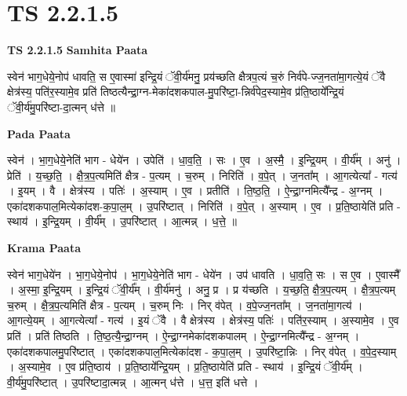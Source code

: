 \documentclass[17pt]{extarticle}
\begin{document}
\section*{ TS 2.2.1.5 }

\textbf{TS 2.2.1.5 } \newline
\textbf{Samhita Paata} \newline

स्वेन॑ भाग॒धेये॒नोप॑ धावति॒ स ए॒वास्मा॑ इन्द्रि॒यं ॅवी॒र्य॑मनु॒ प्रय॑च्छति क्षैत्रप॒त्यं च॒रुं निर्व॑पे-ज्ज॒नता॑मा॒गत्ये॒यं ॅवै क्षेत्र॑स्य॒ पति॑र॒स्यामे॒व प्रति॑ तिष्ठत्यैन्द्रा॒ग्न-मेका॑दशकपाल-मु॒परि॑ष्टा॒-न्निर्व॑पेद॒स्यामे॒व प्र॑ति॒ष्ठाये᳚न्द्रि॒यं ॅवी॒र्य॑मु॒परि॑ष्टा-दा॒त्मन् ध॑त्ते ॥ \newline

\textbf{Pada Paata} \newline

स्वेन॑ । भा॒ग॒धेये॒नेति॑ भाग - धेये॑न । उपेति॑ । धा॒व॒ति॒ । सः । ए॒व । अ॒स्मै॒ । इ॒न्द्रि॒यम् । वी॒र्य᳚म् । अनु॑ । प्रेति॑ । य॒च्छ॒ति॒ । क्षै॒त्र॒प॒त्यमिति॑ क्षैत्र - प॒त्यम् । च॒रुम् । निरिति॑ । व॒पे॒त् । ज॒नता᳚म् । आ॒गत्येत्या᳚ - गत्य॑ । इ॒यम् । वै । क्षेत्र॑स्य । पतिः॑ । अ॒स्याम् । ए॒व । प्रतीति॑ । ति॒ष्ठ॒ति॒ । ऐ॒न्द्रा॒ग्नमित्यै᳚न्द्र - अ॒ग्नम् । एका॑दशकपाल॒मित्येका॑दश-क॒पा॒ल॒म् । उ॒परि॑ष्टात् । निरिति॑ । व॒पे॒त् । अ॒स्याम् । ए॒व । प्र॒ति॒ष्ठायेति॑ प्रति - स्थाय॑ । इ॒न्द्रि॒यम् । वी॒र्य᳚म् । उ॒परि॑ष्टात् । आ॒त्मन्न् । ध॒त्ते॒ ॥  \newline


\textbf{Krama Paata} \newline

स्वेन॑ भाग॒धेये॑न । भा॒ग॒धेये॒नोप॑ । भा॒ग॒धेये॒नेति॑ भाग - धेये॑न । उप॑ धावति । धा॒व॒ति॒ सः । स ए॒व । ए॒वास्मै᳚ । अ॒स्मा॒ इ॒न्द्रि॒यम् । इ॒न्द्रि॒यं ॅवी॒र्य᳚म् । वी॒र्य॑मनु॑ । अनु॒ प्र । प्र य॑च्छति । य॒च्छ॒ति॒ क्षै॒त्र॒प॒त्यम् । क्षै॒त्र॒प॒त्यम् च॒रुम् । क्षै॒त्र॒प॒त्यमिति॑ क्षैत्र - प॒त्यम् । च॒रुम् निः । निर् व॑पेत् । व॒पे॒ज्ज॒नता᳚म् । ज॒नता॑मा॒गत्य॑ । आ॒गत्ये॒यम् । आ॒गत्येत्या᳚ - गत्य॑ । इ॒यं ॅवै । वै क्षेत्र॑स्य । क्षेत्र॑स्य॒ पतिः॑ । पति॑र॒स्याम् । अ॒स्यामे॒व । ए॒व प्रति॑ । प्रति॑ तिष्ठति । ति॒ष्ठ॒त्यै॒न्द्रा॒ग्नम् । ऐ॒न्द्रा॒ग्नमेका॑दशकपालम् । ऐ॒न्द्रा॒ग्नमित्यै᳚न्द्र - अ॒ग्नम् । एका॑दशकपालमु॒परि॑ष्टात् । एका॑दशकपाल॒मित्येका॑दश - क॒पा॒ल॒म् । उ॒परि॑ष्टा॒न्निः । निर् व॑पेत् । व॒पे॒द॒स्याम् । अ॒स्यामे॒व । ए॒व प्र॑ति॒ष्ठाय॑ । प्र॒ति॒ष्ठाये᳚न्द्रि॒यम् । प्र॒ति॒ष्ठायेति॑ प्रति - स्थाय॑ । इ॒न्द्रि॒यं ॅवी॒र्य᳚म् । वी॒र्य॑मु॒परि॑ष्टात् । उ॒परि॑ष्टादा॒त्मन्न् । आ॒त्मन् ध॑त्ते । ध॒त्त॒ इति॑ धत्ते । \newline
\end{document}

